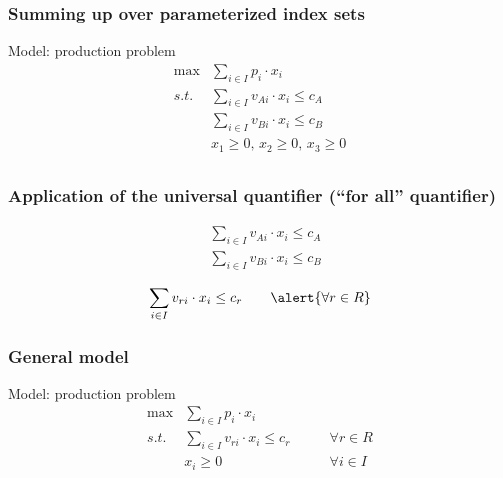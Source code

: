 \begin{frame}
 \frametitle{Summing up over parameterized index sets}
 \begin{block}{Model: production problem}
 \Large
 \begin{equation*}
  \begin{array}{ll}
  \max & \displaystyle\sum_{i\in I} p_i\cdot x_i\\
  s.t. & \displaystyle\sum_{i\in I} v_{Ai}\cdot x_i \leq c_A\\
	& \displaystyle\sum_{i\in I} v_{Bi}\cdot x_i \leq c_B\\
	& x_1\geq0,\,x_2\geq0,\,x_3\geq0\\
  \end{array}
 \end{equation*}
 \end{block}
\end{frame}

\begin{frame}
 \frametitle{Application of the universal quantifier (``for all'' quantifier)}
 \Large
 \begin{align*}
  & \sum_{i\in I} v_{Ai}\cdot x_i \leq c_A\\
  & \sum_{i\in I} v_{Bi}\cdot x_i \leq c_B
 \end{align*}
 \begin{center}\normalsize
 \end{center}
 \begin{equation*}
  \sum_{i\in I} v_{ri}\cdot x_i \leq c_r\qquad\alert{\forall r\in R}
 \end{equation*}
\end{frame}

\begin{frame}
 \frametitle{General model}
 \begin{block}{Model: production problem}
 \begin{equation*}
  \begin{array}{lll}
  \max & \displaystyle\sum_{i\in I} p_i\cdot x_i\\
  s.t. & \displaystyle\sum_{i\in I} v_{ri}\cdot x_i \leq c_r&\qquad\forall r\in R \\
	& x_i\geq0 &\qquad\forall i\in I\\
  \end{array}
 \end{equation*}
 \end{block}
\end{frame}

